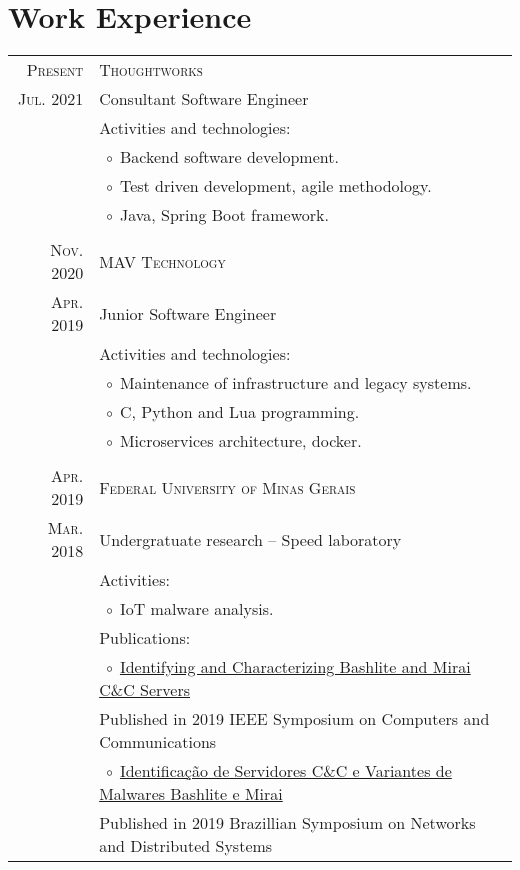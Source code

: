 \documentclass[a4paper,10pt]{article}
\newcommand{\tabitem}{$\;\circ\;$}
\newcommand{\cpp}{C\protect\scalebox{0.8}{\protect\raisebox{0.4ex}{++}}}
\renewcommand\#{\protect\scalebox{0.8}{\protect\raisebox{0.4ex}{\char"0023}}}
\begin{document}
\section{Work Experience}
\begin{tabular}{r|p{12.3cm}}
  \textsc{Present} & \textsc{Thoughtworks} \\
  \textsc{Jul. 2021} & Consultant Software Engineer \\[5pt]
  & Activities and technologies: \\
  & \tabitem Backend software development. \\
  & \tabitem Test driven development, agile methodology. \\
  & \tabitem Java, Spring Boot framework. \\

  \multicolumn{2}{c}{} \\
  \textsc{Nov. 2020} & \textsc{MAV Technology} \\
  \textsc{Apr. 2019} & Junior Software Engineer \\[5pt]
  & Activities and technologies: \\
  & \tabitem Maintenance of infrastructure and legacy systems. \\
  & \tabitem \cpp, Python and Lua programming. \\
  & \tabitem Microservices architecture, docker. \\

  \multicolumn{2}{c}{} \\
  \textsc{Apr. 2019} & \textsc{Federal University of Minas Gerais} \\
  \textsc{Mar. 2018} & Undergratuate research -- Speed laboratory \\[5pt]
  & Activities: \\
  & \tabitem IoT malware analysis. \\
  & Publications: \\
  & \tabitem \href{https://doi.org/10.1109/ISCC47284.2019.8969728}{Identifying and Characterizing Bashlite and Mirai C\&C Servers} \\
  & \phantom{\tabitem}Published in 2019 IEEE Symposium on Computers and Communications \\
  & \tabitem \href{https://doi.org/10.5753/sbrc.2019.7398}{Identificação de Servidores C\&C e Variantes de Malwares Bashlite e Mirai} \\
  & \phantom{\tabitem}Published in 2019 Brazillian Symposium on Networks and Distributed Systems \\


\end{tabular}
\end{document}

